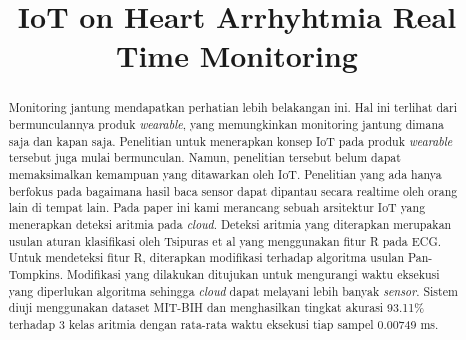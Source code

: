 \documentclass[conference]{IEEEtran}
\begin{document}
\title{IoT on Heart Arrhyhtmia Real Time Monitoring\\
}

\author{
\and
{}
}

\maketitle

\begin{abstract}
Monitoring jantung mendapatkan perhatian lebih belakangan ini. Hal ini terlihat dari bermunculannya produk \textit{wearable}, yang memungkinkan monitoring jantung dimana saja dan kapan saja. Penelitian untuk menerapkan konsep IoT pada produk \textit{wearable} tersebut juga mulai bermunculan. Namun, penelitian tersebut belum dapat memaksimalkan kemampuan yang ditawarkan oleh IoT. Penelitian yang ada hanya berfokus pada bagaimana hasil baca sensor dapat dipantau secara realtime oleh orang lain di tempat lain. Pada paper ini kami merancang sebuah arsitektur IoT yang menerapkan deteksi aritmia pada \textit{cloud}. Deteksi aritmia yang diterapkan merupakan usulan aturan klasifikasi oleh Tsipuras et al yang menggunakan fitur R pada ECG. Untuk mendeteksi fitur R, diterapkan modifikasi terhadap algoritma usulan Pan-Tompkins. Modifikasi yang dilakukan ditujukan untuk mengurangi waktu eksekusi yang diperlukan algoritma sehingga \textit{cloud} dapat melayani lebih banyak \textit{sensor}.  Sistem diuji menggunakan dataset MIT-BIH dan menghasilkan tingkat akurasi 93.11\% terhadap 3 kelas aritmia dengan rata-rata waktu eksekusi tiap sampel 0.00749 ms.
\end{abstract}
\end{document}
